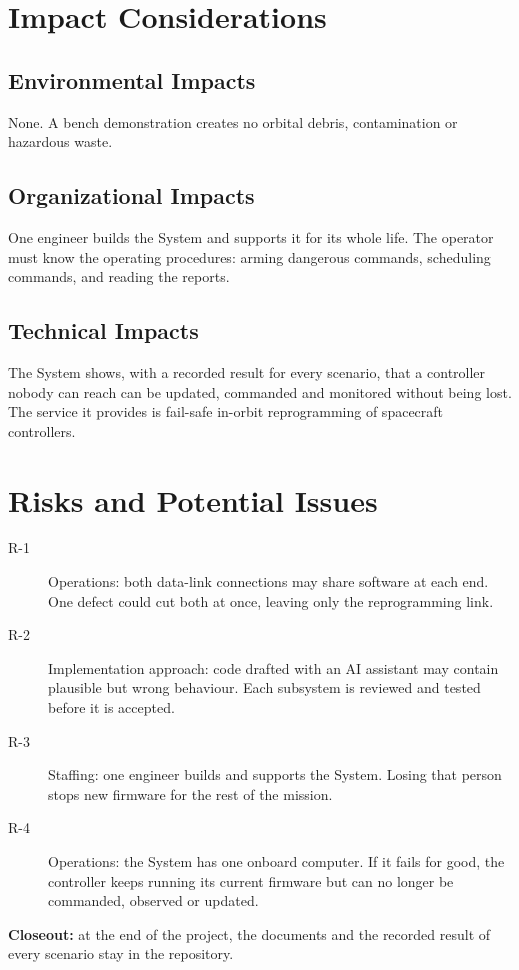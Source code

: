 \documentclass[11pt,a4paper]{article}
\begin{document}
\section{Impact Considerations}

\subsection{Environmental Impacts}
None. A bench demonstration creates no orbital debris, contamination or
hazardous waste.

\subsection{Organizational Impacts}
One engineer builds the System and supports it for its whole life. The operator
must know the operating procedures: arming dangerous commands, scheduling
commands, and reading the reports.

\subsection{Technical Impacts}
The System shows, with a recorded result for every scenario, that a controller
nobody can reach can be updated, commanded and monitored without being lost.
The service it provides is fail-safe in-orbit reprogramming of spacecraft controllers.

\section{Risks and Potential Issues}
\begin{description}
\item[R-1] Operations: both data-link connections may share software at each
  end. One defect could cut both at once, leaving only the reprogramming link.
\item[R-2] Implementation approach: code drafted with an AI assistant may
  contain plausible but wrong behaviour. Each subsystem is reviewed and tested
  before it is accepted.
\item[R-3] Staffing: one engineer builds and supports the System. Losing that
  person stops new firmware for the rest of the mission.
\item[R-4] Operations: the System has one onboard computer. If it fails for
  good, the controller keeps running its current firmware but can no longer be
  commanded, observed or updated.
\end{description}
\noindent\textbf{Closeout:} at the end of the project, the documents and the
recorded result of every scenario stay in the repository.
\end{document}
